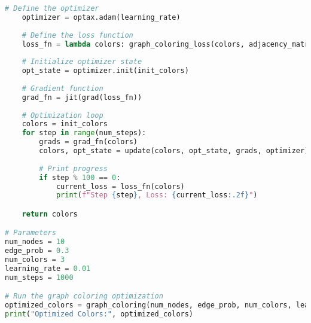 \begin{lstlisting}[language=Python]
    # Define the optimizer
    optimizer = optax.adam(learning_rate)
    
    # Define the loss function
    loss_fn = lambda colors: graph_coloring_loss(colors, adjacency_matrix)
    
    # Initialize optimizer state
    opt_state = optimizer.init(init_colors)
    
    # Gradient function
    grad_fn = jit(grad(loss_fn))
    
    # Optimization loop
    colors = init_colors
    for step in range(num_steps):
        grads = grad_fn(colors)
        colors, opt_state = update(colors, opt_state, grads, optimizer)
        
        # Print progress
        if step % 100 == 0:
            current_loss = loss_fn(colors)
            print(f"Step {step}, Loss: {current_loss:.2f}")

    return colors

# Parameters
num_nodes = 10
edge_prob = 0.3
num_colors = 3
learning_rate = 0.01
num_steps = 1000

# Run the graph coloring optimization
optimized_colors = graph_coloring(num_nodes, edge_prob, num_colors, learning_rate, num_steps)
print("Optimized Colors:", optimized_colors)
\end{lstlisting}
